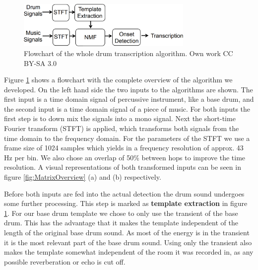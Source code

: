 \documentclass{article}
\begin{document}
\begin{figure}[htb]

\begin{minipage}[b]{1.0\linewidth}
  \centering
  \centerline{\includegraphics[width=8.5cm]{figures/Flowchart}}
  \medskip
\end{minipage}

\caption{Flowchart of the whole drum transcription algorithm. \scriptsize{\textsf{\textcopyright} Own work CC BY-SA 3.0}}
\label{fig:Flowchart}

\end{figure}


Figure \ref{fig:Flowchart} shows a flowchart with the complete overview of the algorithm we developed.
On the left hand side the two inputs to the algorithms are shown.
The first input is a time domain signal of percussive instrument, like a base drum, and the second input is a time domain signal of a piece of music.
For both inputs the first step is to down mix the signals into a mono signal.
Next the short-time Fourier transform (STFT) is applied, which transforms both signals from the time domain to the frequency domain.
For the parameters of the STFT we use a frame size of 1024 samples which yields in a frequency resolution of approx. 43 Hz per bin.
We also chose an overlap of 50\% between hops to improve the time resolution.
A visual representations of both transformed inputs can be seen in figure \ref{fig:MatrixOverview} (a) and (b) respectively.

Before both inputs are fed into the actual detection the drum sound undergoes some further processing.
This step is marked as \textbf{template extraction} in figure \ref{fig:Flowchart}.
For our base drum template we chose to only use the transient of the base drum.
This has the advantage that it makes the template independent of the length of the original base drum sound.
As most of the energy is in the transient it is the most relevant part of the base drum sound.
Using only the transient also makes the template somewhat independent of the room it was recorded in, as any possible reverberation or echo is cut off.
\end{document}
